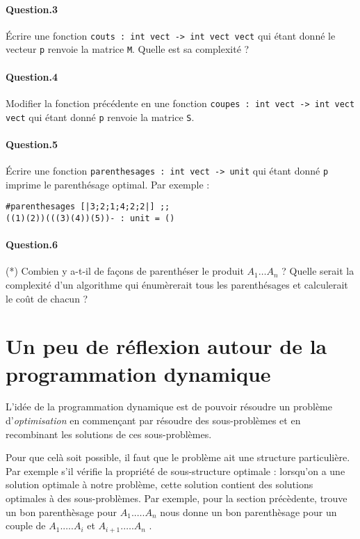 \documentclass[10pt,a4paper]{article}
\begin{document}
\paragraph{Question.3} Écrire une fonction \texttt{couts : int vect -> int vect vect}
qui étant donné le vecteur \texttt{p} renvoie la matrice \texttt{M}. Quelle est
sa complexité ?

\paragraph{Question.4} Modifier la fonction précédente en une fonction 
\texttt{coupes : int vect -> int vect vect} qui étant donné \texttt{p} renvoie
la matrice \texttt{S}.

\paragraph{Question.5} Écrire une fonction \texttt{parenthesages : int vect -> unit}
qui étant donné \texttt{p} imprime le parenthésage optimal. Par exemple :
\begin{verbatim}#parenthesages [|3;2;1;4;2;2|] ;;
((1)(2))(((3)(4))(5))- : unit = () \end{verbatim}

\paragraph{Question.6} (*) Combien y a-t-il de façons de parenthéser le produit
$A_1 \dots A_n$ ? Quelle serait la complexité d'un algorithme qui énumèrerait
tous les parenthésages et calculerait le coût de chacun ?

\section{Un peu de réflexion autour de la programmation dynamique}
L'idée de la programmation dynamique est de pouvoir résoudre un problème
d'\emph{optimisation} en
commençant par résoudre des sous-problèmes et en recombinant les solutions de
ces sous-problèmes. 

Pour que celà soit possible, il faut que le problème ait une structure
particulière. Par exemple s'il vérifie la propriété de sous-structure optimale :
lorsqu'on a une solution optimale à notre problème, cette solution contient des
solutions optimales à des sous-problèmes.
Par exemple, pour la section précèdente, trouve un bon parenthèsage pour
$A_1.\dots.A_n$ nous donne un bon parenthèsage pour un couple de 
$A_1.\dots.A_i$ et $A_{i+1}.\dots.A_n$ .
\end{document}
